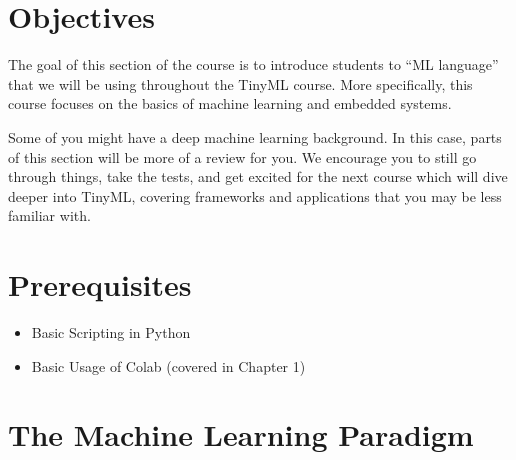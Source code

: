 \section{Objectives}

The goal of this section of the course is to introduce students to “ML language” that we will be using throughout the TinyML course. More specifically, this course focuses on the basics of machine learning and embedded systems.

Some of you might have a deep machine learning background. In this case, parts of this section will be more of a review for you. We encourage you to still go through things, take the tests, and get excited for the next course which will dive deeper into TinyML, covering frameworks and applications that you may be less familiar with.

\section{Prerequisites}

\begin{itemize}
  \item Basic Scripting in Python
  \item Basic Usage of Colab (covered in Chapter 1)
\end{itemize}




\section{The Machine Learning Paradigm}

